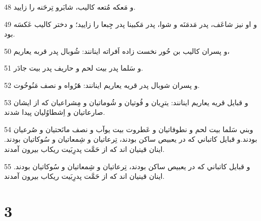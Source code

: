 \par 48 و مَعکه مُتعه کاليب، شابَرو تِرحَنه را زاييد.
\par 49 و او نيز شاعَف، پدر مَدمَنَه و شوا، پدر مَکبينا پدر جِبعا را زاييد؛ و دختر کاليب عَکسَه بود.
\par 50 و پسران کاليب بن حُور نخست زاده اَفراته اينانند: شُوبال پدر قربه يعاريم،
\par 51 و سَلما پدر بيت لحم و حاريف پدر بيت جادَر.
\par 52 و پسران شوبال پدر قريه يعاريم اينانند: هَرُواه و نصف مَنُوحُوت.
\par 53 و قبايل قريه يعاريم اينانند: يترِيان و فُوتيان و شُوماتيان و مِشراعيان که از ايشان صارعاتيان و اِشطاوُليان پيدا شدند.
\par 54 وبني سَلما بيت لحم و نطوفاتيان و عَطروت بيت يوآب و نصف مانَحتيان و صُرعيان بودند.و قبايل کاتباني که در يعبيص ساکن بودند، تِرعاتيان و شِمعاتيان و سُوکاتيان بودند. اينان قينيان اند که از حَمَّت پدرِبَيت ريکاب بيرون آمدند.
\par 55 و قبايل کاتباني که در يعبيص ساکن بودند، تِرعاتيان و شِمعاتيان و سُوکاتيان بودند. اينان قينيان اند که از حَمَّت پدرِبَيت ريکاب بيرون آمدند.
 
\chapter{3}

